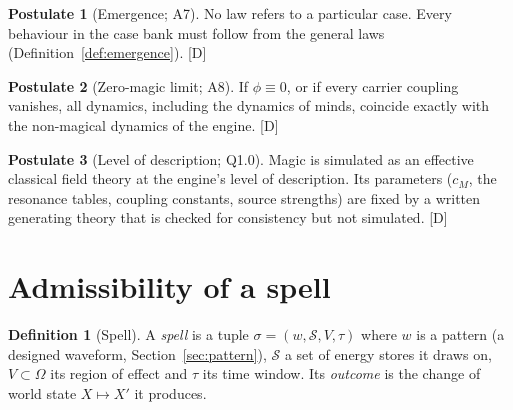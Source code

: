 \documentclass[11pt,a4paper]{article}
\numberwithin{equation}{section}
\theoremstyle{definition}
\newtheorem{definition}{Definition}[section]
\newtheorem{postulate}{Postulate}
\theoremstyle{plain}
\theoremstyle{remark}
\newcommand{\cM}{c_{M}}
\newcommand{\tagD}{\textcolor{tag}{\textsf{[D]}}}
\begin{document}
\begin{postulate}[Emergence; A7]\label{post:emergence}
No law refers to a particular case. Every behaviour in the case bank must follow from the general laws (Definition~\ref{def:emergence}). \tagD
\end{postulate}

\begin{postulate}[Zero-magic limit; A8]\label{post:limit}
If $\phi\equiv 0$, or if every carrier coupling vanishes, all dynamics, including the dynamics of minds, coincide exactly with the non-magical dynamics of the engine. \tagD
\end{postulate}

\begin{postulate}[Level of description; Q1.0]\label{post:level}
Magic is simulated as an effective classical field theory at the engine's level of description. Its parameters ($\cM$, the resonance tables, coupling constants, source strengths) are fixed by a written generating theory that is checked for consistency but not simulated. \tagD
\end{postulate}

\section{Admissibility of a spell}\label{sec:admissible}

\begin{definition}[Spell]\label{def:spell}
A \emph{spell} is a tuple $\sigma = (w, \mathcal S, V, \tau)$ where $w$ is a pattern (a designed waveform, Section~\ref{sec:pattern}), $\mathcal S$ a set of energy stores it draws on, $V\subset\Omega$ its region of effect and $\tau$ its time window. Its \emph{outcome} is the change of world state $X\mapsto X'$ it produces.
\end{definition}
\end{document}
